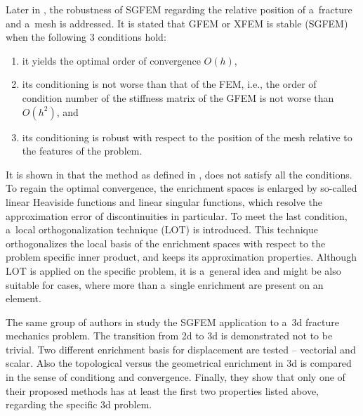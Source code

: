 Later in \cite{zhang_robust_2016}, the robustness of SGFEM regarding the relative position of a~fracture and a~mesh is addressed.
It is stated that GFEM or XFEM is stable (SGFEM) when the following 3 conditions hold:
\begin{enumerate}[label=(\alph*)]
        \item \label{enum:sgfem_conditions_a} it yields the optimal order of convergence $O(h)$,
        \item \label{enum:sgfem_conditions_b} its conditioning is not worse than that of the FEM, i.e., the order of condition number of the stiffness matrix of the
        GFEM is not worse than $O(h^2)$, and
        \item \label{enum:sgfem_conditions_c} its conditioning is robust with respect to the position of the mesh relative to the features of the problem.
\end{enumerate}
It is shown in \cite{zhang_robust_2016} that the method as defined in \cite{babuska_stable_2012,gupta_stable_2013}, %
does not satisfy all the conditions. %
To regain the optimal convergence, the enrichment spaces is enlarged by so-called linear Heaviside functions and linear singular functions,
which resolve the approximation error of discontinuities in particular.
To meet the last condition, a~local orthogonalization technique (LOT) is introduced.
This technique orthogonalizes the local basis of the enrichment spaces with respect to the problem specific inner product,
and keeps its approximation properties. Although LOT is applied on the specific problem,
it is a~general idea and might be also suitable for cases, where more than a~single enrichment are present on an element.

The same group of authors in \cite{gupta_3d_fracture_2015} study the SGFEM application to a~3d fracture mechanics problem.
The transition from 2d to 3d is demonstrated not to be trivial. Two different enrichment basis for displacement are tested -- vectorial and scalar.
Also the topological versus the geometrical enrichment in 3d is compared in the sense of conditiong and convergence.
Finally, they show that only one of their proposed methods has at least the first two properties listed above,
regarding the specific 3d problem.




